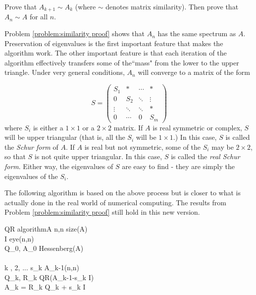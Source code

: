 \begin{problem}
\label{problem:similarity proof}
Prove that $A_{k+1} \sim A_k$ (where $\sim$ denotes matrix similarity). Then prove that $A_n \sim A$ for all $n$.  
\end{problem}

Problem \ref{problem:similarity proof} shows that $A_n$ has the same spectrum as $A$. Preservation of eigenvalues is the first important feature that makes the algorithm work. The other important feature is that each iteration of the algorithm effectively transfers some of the``mass" from the lower to the upper triangle. Under very general conditions, $A_n$ will converge to a matrix of the form

\begin{equation}
\label{eq:Schur form}
S = 
     \begin{pmatrix}
          S_1 &* & \cdots & * \\
           0     &S_2  &  \ddots & \vdots \\
           \vdots  & \ddots & \ddots & *  \\
           0 & \cdots & 0 & S_m
    \end{pmatrix}
\end{equation}
where $S_i$ is either a $1 \times 1$ or a $2 \times 2$ matrix. If $A$ is real symmetric or complex, $S$ will be upper triangular (that is, all the $S_i$ will be $1 \times 1$.) In this case, $S$ is called the \emph{Schur form} of $A$. If $A$ is real but not symmetric, some of the $S_i$ may be $2 \times 2$, so that $S$ is not quite upper triangular. In this case, $S$ is called the \emph{real Schur form}. Either way, the eigenvalues of $S$ are easy to find - they are simply the eigenvalues of the $S_i$.

The following algorithm is based on the above process but is closer to what is actually done in the real world of numerical computing. The results from Problem \ref{problem:similarity proof} still hold in this new version.

\begin{pseudo}{QR algorithm}{A}
\label{Alg:QR algorithm}
n,n \GETS size(A)\\
I \GETS eye(n,n)\\
 Q_0, A_0 \GETS Hessenberg(A)\\
\\
\FOR k , 2, ... \DO
\BEGIN
	s_k \GETS A_{k-1}(n,n)\\
	Q_k, R_k \GETS QR(A_{k-1}-s_k I)\\
	A_k = R_k Q_k + s_k I
\END
\end{pseudo}

